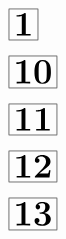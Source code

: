 \documentclass[a4paper, 10pt]{article}
\begin{document}
\thispagestyle{empty}
\begin{minipage}[t]{0.17\textwidth}
                \vspace*{-1.59cm}
        \hspace*{2.4cm}
        $\boxed{\textbf{\Huge1}}$
\end{minipage}
\begin{minipage}[t]{0.83\textwidth}
        
\end{minipage}

\thispagestyle{empty}
\begin{minipage}[t]{0.17\textwidth}
                \vspace*{-1.59cm}
        \hspace*{2.4cm}
        $\boxed{\textbf{\Huge10}}$
\end{minipage}
\begin{minipage}[t]{0.83\textwidth}
        
\end{minipage}

\thispagestyle{empty}
\begin{minipage}[t]{0.17\textwidth}
                \vspace*{-1.59cm}
        \hspace*{2.4cm}
        $\boxed{\textbf{\Huge11}}$
\end{minipage}
\begin{minipage}[t]{0.83\textwidth}
        
\end{minipage}

\thispagestyle{empty}
\begin{minipage}[t]{0.17\textwidth}
                \vspace*{-1.59cm}
        \hspace*{2.4cm}
        $\boxed{\textbf{\Huge12}}$
\end{minipage}
\begin{minipage}[t]{0.83\textwidth}
        
\end{minipage}

\thispagestyle{empty}
\begin{minipage}[t]{0.17\textwidth}
                \vspace*{-1.59cm}
        \hspace*{2.4cm}
        $\boxed{\textbf{\Huge13}}$
\end{minipage}
\begin{minipage}[t]{0.83\textwidth}
        
\end{minipage}
\end{document}
